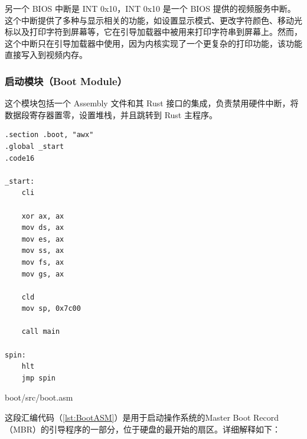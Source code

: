 另一个 BIOS 中断是 INT 0x10，INT 0x10 是一个 BIOS 提供的视频服务中断。这个中断提供了多种与显示相关的功能，如设置显示模式、更改字符颜色、移动光标以及打印字符到屏幕等，它在引导加载器中被用来打印字符串到屏幕上。然而，这个中断只在引导加载器中使用，因为内核实现了一个更复杂的打印功能，该功能直接写入到视频内存。

\subsubsection{启动模块（Boot Module）}

这个模块包括一个 Assembly 文件和其 Rust 接口的集成，负责禁用硬件中断，将数据段寄存器置零，设置堆栈，并且跳转到 Rust 主程序。

\begin{listing}[htbp]
    \begin{verbatim}
.section .boot, "awx"
.global _start
.code16

_start:
    cli

    xor ax, ax
    mov ds, ax
    mov es, ax
    mov ss, ax
    mov fs, ax
    mov gs, ax

    cld
    mov sp, 0x7c00

    call main

spin:
    hlt
    jmp spin
    \end{verbatim}
    \caption{boot/src/boot.asm}\label{lst:BootASM}
\end{listing}

这段汇编代码（\cref{lst:BootASM}）是用于启动操作系统的Master Boot Record（MBR）的引导程序的一部分，位于硬盘的最开始的扇区。详细解释如下：

